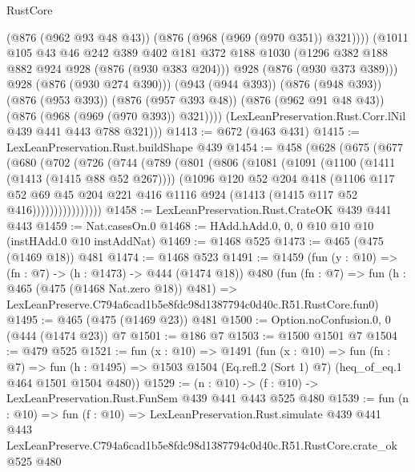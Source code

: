 \begin{lexlean}{RustCore}
\begin{coremodule}
                  (@876 (@962 @93 @48 @43))
                  (@876 (@968 (@969 (@970 @351)) @321))))
              (@1011
                @105
                @43
                @46
                @242
                @389
                @402
                @181
                @372
                @188
                @1030
                (@1296 @382 @188 @882 @924 @928 (@876 (@930 @383 @204)))
                @928
                (@876 (@930 @373 @389)))
              @928
              (@876 (@930 @274 @390)))
            (@943 (@944 @393))
            (@876 (@948 @393))
            (@876 (@953 @393))
            (@876 (@957 @393 @48))
            (@876 (@962 @91 @48 @43))
            (@876 (@968 (@969 (@970 @393)) @321))))
        (LexLeanPreservation.Rust.Corr.lNil @439 @441 @443 @788 @321)))
@1413 := @672 (@463 @431)
@1415 := LexLeanPreservation.Rust.buildShape @439
@1454 := @458
    (@628
      (@675
        (@677
          (@680
            (@702
              (@726
                (@744
                  (@789
                    (@801
                      (@806
                        (@1081
                          (@1091
                            (@1100 (@1411 (@1413 (@1415 @88 @52 @267))))
                            (@1096
                              @120
                              @52
                              @204
                              @418
                              (@1106
                                @117
                                @52
                                @69
                                @45
                                @204
                                @221
                                @416
                                @1116
                                @924
                                (@1413 (@1415 @117 @52 @416))))))))))))))))
@1458 := LexLeanPreservation.Rust.CrateOK @439 @441 @443
@1459 := Nat.casesOn.{0}
@1468 := HAdd.hAdd.{0, 0, 0} @10 @10 @10 (instHAdd.{0} @10 instAddNat)
@1469 := @1468 @525
@1473 := @465 (@475 (@1469 @18)) @481
@1474 := @1468 @523
@1491 := @1459
    (fun (y : @10) => (fn : @7) -> (h : @1473) -> @444 (@1474 @18))
    @480
    (fun (fn : @7) =>
    fun (h : @465 (@475 (@1468 Nat.zero @18)) @481) =>
    LexLeanPreserve.C794a6cad1b5e8fdc98d1387794c0d40c.R51.RustCore.fun0)
@1495 := @465 (@475 (@1469 @23)) @481
@1500 := Option.noConfusion.{0, 0} (@444 (@1474 @23)) @7
@1501 := @186 @7
@1503 := @1500 @1501 @7
@1504 := @479 @525
@1521 := fun (x : @10) =>
  @1491
    (fun (x : @10) =>
    fun (fn : @7) =>
    fun (h : @1495) => @1503 @1504 (Eq.refl.{2} (Sort 1) @7) (heq_of_eq.{1} @464 @1501 @1504 @480))
@1529 := (n : @10) -> (f : @10) -> LexLeanPreservation.Rust.FunSem @439 @441 @443 @525 @480
@1539 := fun (n : @10) =>
  fun (f : @10) =>
  LexLeanPreservation.Rust.simulate
    @439
    @441
    @443
    LexLeanPreserve.C794a6cad1b5e8fdc98d1387794c0d40c.R51.RustCore.crate_ok
    @525
    @480
\end{coremodule}
\end{lexlean}

